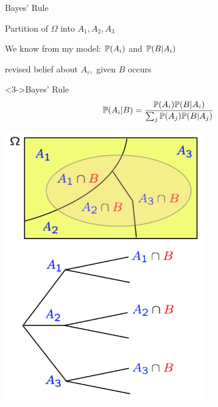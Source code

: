 \documentclass[fleqn,aspectratio=169]{beamer}
\begin{document}
\begin{frame}{Bayes' Rule}

{
\plitemsep 0.1in

\bci
\item Partition of $\Omega$ into $A_1,A_2,A_3$

\item We know from my model: $\mathbb{P}( A_i )$ and $\mathbb{P}( B | A_i )$ 

\item<2-> 

\item<2-> revised belief about $A_i,$ given $B$ occurs

\begin{block}<3->{Bayes' Rule}
$$
\mathbb{P}( A_i | B ) = \frac{\mathbb{P}( A_i ) \mathbb{P}( B | A_i )}{\sum_{j} \mathbb{P}( A_j ) \mathbb{P}( B | A_j )}
$$
\end{block}

\eci 
}
{
\centering
\includegraphics[width=0.65\textwidth]{L2_total_ex.png}
}

\end{frame}
\end{document}

